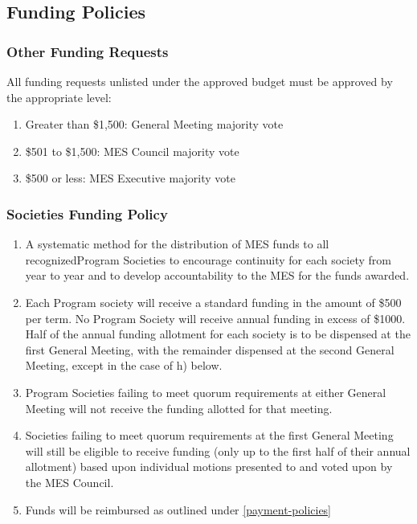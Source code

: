 \subsection{Funding Policies}
\label{funding-policies}

\subsubsection{Other Funding Requests}
\label{other-funding-requests}
All funding requests unlisted under the approved budget must be approved
by the appropriate level:

\begin{enumerate}
 \item
  Greater than \$1,500: General Meeting majority vote
 \item
  \$501 to \$1,500: MES Council majority vote
 \item
  \$500 or less: MES Executive majority vote

\end{enumerate}

\subsubsection{Societies Funding Policy}
\label{societies-funding-policy}
\begin{enumerate}
 \item
  A systematic method for the distribution of MES funds to all recognizedProgram Societies to encourage continuity for each society from year to year and to develop accountability to the MES for the funds awarded. %
 \item
  Each Program society will receive a standard funding in the amount of \$500 per term. No Program Society will receive annual funding in excess of \$1000. Half of the annual funding allotment for each society is to be dispensed at the first General Meeting, with the remainder dispensed at the second General Meeting, except in the case of h) below. %
 \item
  Program Societies failing to meet quorum requirements at either General Meeting will not receive the funding allotted for that meeting.
 \item
  Societies failing to meet quorum requirements at the first General Meeting will still be eligible to receive funding (only up to the first half of their annual allotment) based upon individual motions presented to and voted upon by the MES Council.
 \item
  Funds will be reimbursed as outlined under \ref{payment-policies}

\end{enumerate}

